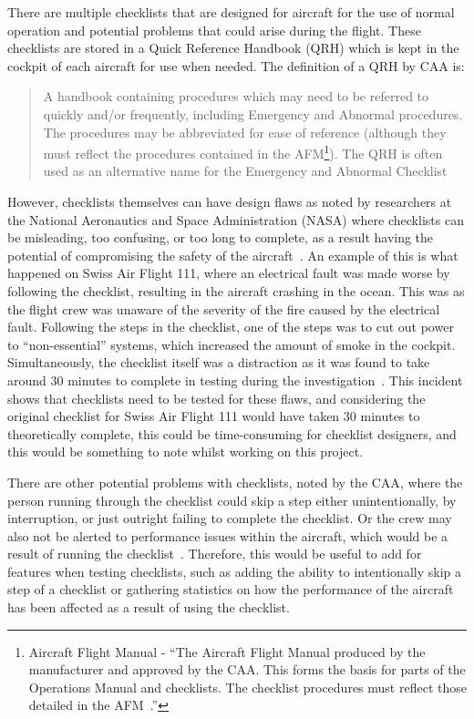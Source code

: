 \documentclass[../dissertation.tex]{subfiles}
\begin{document}
There are multiple checklists that are designed for aircraft for the use of
normal operation and potential problems that could arise during the flight.
These checklists are stored in a Quick Reference Handbook (QRH) which is
kept in the cockpit of each aircraft for use when needed. The definition
of a QRH by CAA is:
%
\blockquote{A handbook containing procedures which
  may need to be referred to quickly and/or
  frequently, including Emergency and
  Abnormal procedures. The procedures
  may be abbreviated for ease of reference
  (although they must reflect the procedures
  contained in the AFM\footnote{
    Aircraft Flight Manual - \enquote{The Aircraft Flight Manual produced by the
    manufacturer and approved by the CAA.
    This forms the basis for parts of the
    Operations Manual and checklists. The
    checklist procedures must reflect those
    detailed in the AFM~\cite{caa:design}.}
  }).
  The QRH is often
  used as an alternative name for the
  Emergency and Abnormal Checklist~\cite{caa:design}}.

However, checklists themselves can have design flaws as noted by researchers at
the National Aeronautics and Space Administration (NASA) where checklists
can be misleading, too confusing, or too long to complete, as a result
having the potential of compromising the safety of the aircraft~\cite{nasa:design}.
An example of this is what happened on Swiss Air Flight 111, where an electrical fault
was made worse by following the checklist, resulting in the aircraft crashing in the ocean.
This was as the flight crew was unaware of the severity of the fire caused by the
electrical fault. Following the steps in the checklist, one of the steps was
to cut out power to \enquote{non-essential} systems, which increased the
amount of smoke in the cockpit.
Simultaneously, the checklist itself was a distraction as it was found to take
around 30 minutes to complete in testing during the investigation~\cite{tsb:SWR111}.
This incident shows that checklists need to be tested for these flaws, and considering
the original checklist for Swiss Air Flight 111 would have taken 30 minutes
to theoretically complete, this could be time-consuming for checklist designers,
and this would be something to note whilst working on this project.

There are other potential problems with checklists,
noted by the CAA, where the person running through the checklist could skip a step
either unintentionally, by interruption, or just outright failing to complete the
checklist. Or the crew may also not be alerted to performance issues within the aircraft,
which would be a result of running the checklist~\cite{caa:design}. Therefore,
this would be useful to add for features when testing checklists, such as
adding the ability to intentionally skip a step of a checklist or gathering
statistics on how the performance of the aircraft has been affected as a result
of using the checklist.
\end{document}
